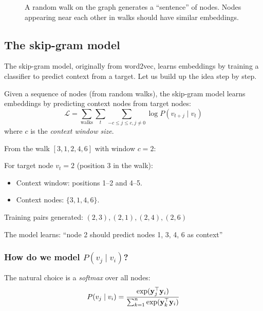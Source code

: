 \begin{notechapter}
\begin{figure}[htbp]
\caption{A random walk on the graph generates a ``sentence'' of nodes. Nodes appearing near each other in walks should have similar embeddings.}
\label{shallow-embeddings:fig:random_walk}
\end{figure}

\subsection{The skip-gram model}

The skip-gram model, originally from word2vec, learns embeddings by training a classifier to predict context from a target. Let us build up the idea step by step.

\begin{definition}
Given a sequence of nodes (from random walks), the skip-gram model learns embeddings by predicting context nodes from target nodes:
\[
\mathcal{L} = \sum_{\text{walks}} \sum_{t} \sum_{-c \leq j \leq c, j \neq 0} \log P(v_{t+j} \mid v_t)
\]
where $c$ is the \emph{context window size}.
\end{definition}

\begin{example}
From the walk $[3, 1, 2, 4, 6]$ with window $c = 2$:

For target node $v_t = 2$ (position 3 in the walk):
\begin{itemize}
    \item Context window: positions 1--2 and 4--5.
    \item Context nodes: $\{3, 1, 4, 6\}$.
\end{itemize}

Training pairs generated: $(2, 3), (2, 1), (2, 4), (2, 6)$

The model learns: ``node 2 should predict nodes 1, 3, 4, 6 as context''
\end{example}

\subsubsection*{How do we model $P(v_j \mid v_i)$?}

The natural choice is a \emph{softmax} over all nodes:
\[
P(v_j \mid v_i) = \frac{\exp(\mathbf{y}_j^\top \mathbf{y}_i)}{\sum_{k=1}^{n} \exp(\mathbf{y}_k^\top \mathbf{y}_i)}
\]


\end{notechapter}
